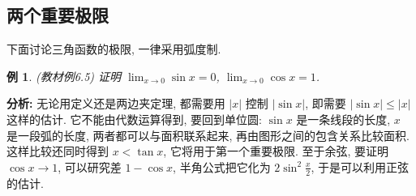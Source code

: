 \documentclass[UTF8,openany]{ctexbook}
\theoremstyle{chinesetextbook}
\newtheorem{example}{例}[section]
\begin{document}
\subsection{两个重要极限}
下面讨论三角函数的极限, 一律采用弧度制.
\begin{example}\label{ex:6-5}
\textnormal{(教材例6.5)} 证明 $\displaystyle\lim_{x\to0}\sin x=0$, $\displaystyle\lim_{x\to0}\cos x=1$.
\end{example}
\par\indent\textbf{分析:} 无论用定义还是两边夹定理, 都需要用 $|x|$ 控制 $|\sin x|$, 即需要 $|\sin x|\le|x|$ 这样的估计. 它不能由代数运算得到, 要回到单位圆: $\sin x$ 是一条线段的长度, $x$ 是一段弧的长度, 两者都可以与面积联系起来, 再由图形之间的包含关系比较面积. 这样比较还同时得到 $x<\tan x$, 它将用于第一个重要极限. 至于余弦, 要证明 $\cos x\to1$, 可以研究差 $1-\cos x$, 半角公式把它化为 $\displaystyle2\sin^2\frac x2$, 于是可以利用正弦的估计.
\end{document}
